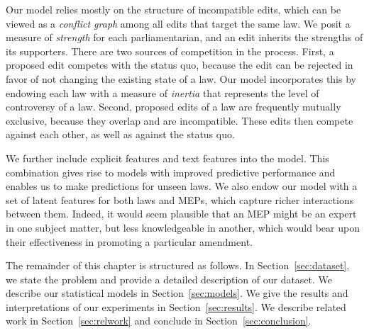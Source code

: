Our model relies mostly on the structure of incompatible edits, which can be viewed as a {\em conflict graph} among all edits that target the same law.
We posit a measure of {\em strength} for each parliamentarian, and an edit inherits the strengths of its supporters.
There are two sources of competition in the process.
First, a proposed edit competes with the status quo, because the edit can be rejected in favor of not changing the existing state of a law.
Our model incorporates this by endowing each law with a measure of {\em inertia} that represents the level of controversy of a law.
Second, proposed edits of a law are frequently mutually exclusive, because they overlap and are incompatible.
These edits then compete against each other, as well as against the status quo.

We further include explicit features and text features into the model.
This combination gives rise to models with improved predictive performance and enables us to make predictions for unseen laws.
We also endow our model with a set of latent features for both laws and MEPs, which capture richer interactions between them.
Indeed, it would seem plausible that an MEP might be an expert in one subject matter, but less knowledgeable in another, which would bear upon their effectiveness in promoting a particular amendment.

The remainder of this chapter is structured as follows.
In Section~\ref{sec:dataset}, we state the problem and provide a detailed description of our dataset.
We describe our statistical models in Section~\ref{sec:models}.
We give the results and interpretations of our experiments in Section~\ref{sec:results}.
We describe related work in Section~\ref{sec:relwork} and conclude in Section~\ref{sec:conclusion}.
